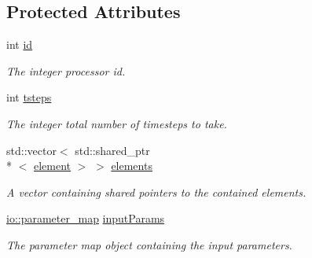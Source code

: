 \subsection*{Protected Attributes}
\begin{DoxyCompactItemize}
\item 
\hypertarget{classbases_1_1master_a153b2f560ec4a629ad291ee405b354b0}{int \hyperlink{classbases_1_1master_a153b2f560ec4a629ad291ee405b354b0}{id}}\label{classbases_1_1master_a153b2f560ec4a629ad291ee405b354b0}

\begin{DoxyCompactList}\small\item\em The integer processor id. \end{DoxyCompactList}\item 
\hypertarget{classbases_1_1master_ab745465f54a5586a856f2c20cf981bdf}{int \hyperlink{classbases_1_1master_ab745465f54a5586a856f2c20cf981bdf}{tsteps}}\label{classbases_1_1master_ab745465f54a5586a856f2c20cf981bdf}

\begin{DoxyCompactList}\small\item\em The integer total number of timesteps to take. \end{DoxyCompactList}\item 
\hypertarget{classbases_1_1master_a784386fab783a6ce7cf6c49ad0687208}{std\-::vector$<$ std\-::shared\-\_\-ptr\\*
$<$ \hyperlink{classbases_1_1element}{element} $>$ $>$ \hyperlink{classbases_1_1master_a784386fab783a6ce7cf6c49ad0687208}{elements}}\label{classbases_1_1master_a784386fab783a6ce7cf6c49ad0687208}

\begin{DoxyCompactList}\small\item\em A vector containing shared pointers to the contained elements. \end{DoxyCompactList}\item 
\hypertarget{classbases_1_1master_a2bef8a5f3c2a7cb1c56e49e62b3db61c}{\hyperlink{namespaceio_a1c55c654666eeece6a9724f453fdbd87}{io\-::parameter\-\_\-map} \hyperlink{classbases_1_1master_a2bef8a5f3c2a7cb1c56e49e62b3db61c}{input\-Params}}\label{classbases_1_1master_a2bef8a5f3c2a7cb1c56e49e62b3db61c}

\begin{DoxyCompactList}\small\item\em The parameter map object containing the input parameters. \end{DoxyCompactList}\end{DoxyCompactItemize}


